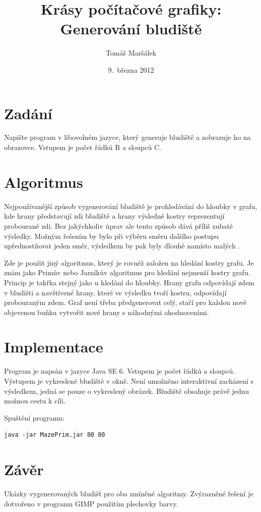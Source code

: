\documentclass[11pt]{article}
\title{Krásy počítačové grafiky: Generování bludiště}
\author{Tomáš Maršálek}
\date{9.\, března 2012}
\begin{document}
\maketitle

\section{Zadání}
Napište program v libovolném jazyce, který generuje bludiště a zobrazuje ho na
obrazovce. Vstupem je počet řádků R a sloupců C.

\section{Algoritmus}
Nejpoužívanější způsob vygenerování bludiště je prohledávání do hloubky v
grafu, kde hrany představují zdi bludiště a hrany výsledné kostry reprezentují
probourané zdi. Bez jakýchkoliv úprav ale tento způsob dává příliš zubaté
výsledky. Možným řešením by bylo při výběru směru dalšího postupu
upřednostňovat jeden směr, výsledkem by pak byly dlouhé  namísto
malých .

Zde je použit jiný algoritmus, který je rovněž založen na hledání kostry grafu.
Je znám jako Primův nebo Jarníkův algoritmus pro hledání nejmenší kostry grafu.
Princip je takřka stejný jako u hledání do hloubky. Hrany grafu odpovídají zdem
v bludišti a navštívené hrany, které ve výsledku tvoří kostru, odpovídají
probouraným zdem. Graf není třeba předgenerovat celý, stačí pro každou nově
objevenou buňku vytvořit nové hrany s náhodnými ohodnoceními.

\section{Implementace}
Program je napsán v jazyce Java SE 6. Vstupem je počet řádků a sloupců.
Výstupem je vykreslené bludiště v okně. Není umožněno interaktivní zacházení s
výsledkem, jedná se pouze o vykreslený obrázek. Bludiště obsahuje právě jednu
možnou cestu k cíli.

Spuštění programu:
\begin{verbatim}
java -jar MazePrim.jar 80 80
\end{verbatim}

\section{Závěr}
Ukázky vygenerovaných bludišť pro oba zmíněné algoritmy.
Zvýrazněné řešení je dotvořeno v programu GIMP použitím plechovky barvy.
\end{document}
